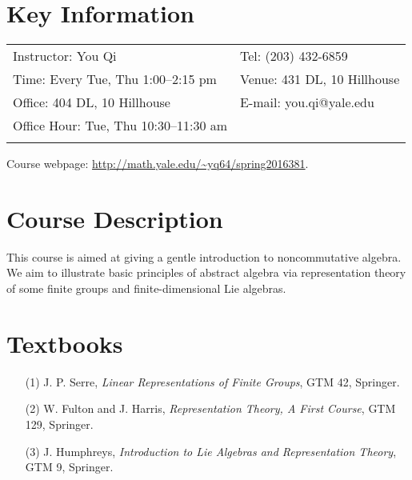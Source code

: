 \documentclass[margin,line]{res}
\begin{document}

\begin{resume}

\section{\sc Key Information}
\vspace{.05in}
\begin{tabular}{@{}p{3.4in}p{4in}}
 Instructor: You Qi            & Tel: (203) 432-6859   \\
Time: Every Tue, Thu 1:00--2:15 pm & Venue: 431 DL, 10 Hillhouse\\
Office: 404 DL, 10 Hillhouse   & E-mail:  you.qi@yale.edu \\
Office Hour: Tue, Thu 10:30--11:30 am &\\
& \\
\end{tabular}
Course webpage: \url{http://math.yale.edu/~yq64/spring2016381}.

\section{\sc Course Description}
This course is aimed at giving a gentle introduction to noncommutative algebra. We aim to illustrate basic principles of abstract algebra via representation theory of some finite groups and finite-dimensional Lie algebras.

\section{\sc Textbooks}
\begin{itemize}
\item[(1)] J. P. Serre, \emph{Linear Representations of Finite Groups}, GTM 42, Springer.

\item[(2)] W. Fulton and J. Harris, \emph{Representation Theory, A First Course}, GTM 129, Springer. 

\item[(3)] J. Humphreys, \emph{Introduction to Lie Algebras and Representation Theory}, GTM 9, Springer.
\end{itemize}


\end{resume}
\end{document}
